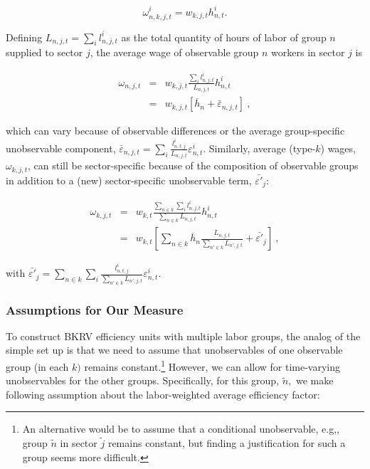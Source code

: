\documentclass[10pt]{article}
\begin{document}
\begin{equation}
\omega_{n,k,j,t}^{i}=w_{k,j,t}h_{n,t}^{i}. \label{eq:eff wage}
\end{equation}

Defining $L_{n,j,t}=\sum_{i}l_{n,j,t}^{i}$ as the total quantity of hours of labor of group $n$ supplied to sector $j$, the average wage of observable group $n$ workers in sector $j$ is

\begin{eqnarray*}
\omega_{n,j,t} & = & w_{k,j,t}\frac{\sum_{i}l_{n,j,t}^{i}}{L_{n,j,t}}h_{n,t}^{i}\\
 & = & w_{k,j,t}\left[\overline{h}_{n}+\bar{\varepsilon}_{n,j,t}\right] \ ,
\end{eqnarray*}

which can vary because of observable differences or the average group-specific unobservable component, $\bar{\varepsilon}_{n,j,t}=\sum_{i}\frac{l_{n,t,j}^{i}}{L_{n,j,t}}\varepsilon_{n,t}^{i}$.
Similarly, average (type-$k$) wages, $\omega_{k,j,t}$, can still be sector-specific because of the composition of observable groups in addition to a (new) sector-specific unobservable term, $\bar{\varepsilon'}_{j}$:

\begin{eqnarray*}
\omega_{k,j,t} & = & w_{k,t}\frac{\sum_{n\in k}\sum_{i}l_{n,j,t}^{i}}{\sum_{n\in k}L_{n,j,t}}h_{n,t}^{i}\\
 & = & w_{k,t}\left[\sum_{n\in k}\overline{h}_{n}\frac{L_{n,j,t}}{\sum_{n'\in k}L_{n',j,t}}+\bar{\varepsilon'}_{j}\right] \ ,
\end{eqnarray*}

with $\bar{\varepsilon'}_{j}=\sum_{n\in k}\sum_{i}\frac{l_{n,t,j}^{i}}{\sum_{n'\in k}L_{n',j,t}}\varepsilon_{n,t}^{i}$. 

\subsubsection{Assumptions for Our Measure}

To construct BKRV efficiency units with multiple labor groups, the analog of the simple set up is that we need to assume that unobservables of one observable group (in each $k)$ remains constant.\footnote{An alternative would be to assume that a conditional unobservable, e.g,, group $\tilde{n}$ in sector $\tilde{j}$ remains constant, but finding a justification for such a group seems more difficult.} However, we can allow for time-varying unobservables for the other groups. Specifically, for this group, $\tilde{n},$ we make following assumption about the labor-weighted average efficiency factor:
\end{document}
